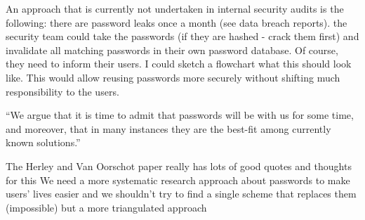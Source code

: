 An approach that is currently not undertaken in internal security audits is the following: there are password leaks once a month (see data breach reports). the security team could take the passwords (if they are hashed - crack them first) and invalidate all matching passwords in their own password database. Of course, they need to inform their users. I could sketch a flowchart what this should look like. This would allow reusing passwords more securely without shifting much responsibility to the users. 

``We argue that it is time to admit that passwords will be with us for some time, and moreover, that in many instances they are the best-fit among currently known solutions.'' \cite{Herley2012PersistenceOfPasswords} 

The Herley and Van Oorschot paper really has lots of good quotes and thoughts for this
We need a more systematic research approach about passwords to make users' lives easier and we shouldn't try to find a single scheme that replaces them (impossible) but a more triangulated approach \cite{Herley2012PersistenceOfPasswords}


\cite{Kirlappos2012SecurityEducation,Loutfi2015PasswordsOtherSideOfTheFence,DeAngeli2005PictureThousandWords,Florencio2013WhereDoAllTheAttacksGo,Herley2008ProfitlessEndeavor,Sasse2015,Dittrich2009,Herley2009SoLongThanksExternalities,Vantaggiato2015WeStillNeedPasswords,Florencio2010WhereDoPoliciesComeFrom,Schrittwieser2013,Bonneau2015ImperfectAuthentication,Cyber2014,Florencio2007DoStrongWebPasswords,Sasse2005UsableSecurityPosition,Aebischer2017PicoInTheWild,Forget2007HelpingUsers,Herley2009IfWereSoSmart,Acar2016NotYourDeveloper,Sasse2016,Renaud2009VisualSnakeOil}

 